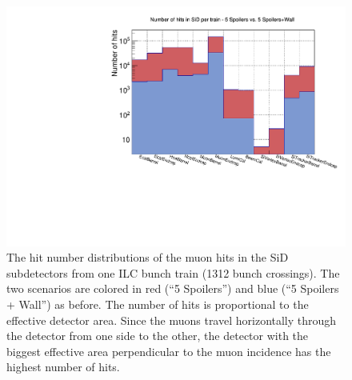 \begin{figure}
    \centering
    \includegraphics[width=\textwidth]{figures/Hits_in_SiD_subdetectors_MuonSpoilerStudy.pdf}
    \caption[Hit number distribution in the SiD subdetectors]{
    The hit number distributions of the muon hits in the SiD subdetectors from one ILC bunch train (1312 bunch crossings).
    The two scenarios are colored in red (``5 Spoilers'') and blue (``5 Spoilers + Wall'') as before.
    The number of hits is proportional to the effective detector area.
    Since the muons travel horizontally through the detector from one side to the other, the detector with the biggest effective area perpendicular to the muon incidence has the highest number of hits.
    }
    \label{fig:hit_distribution}
\end{figure}

